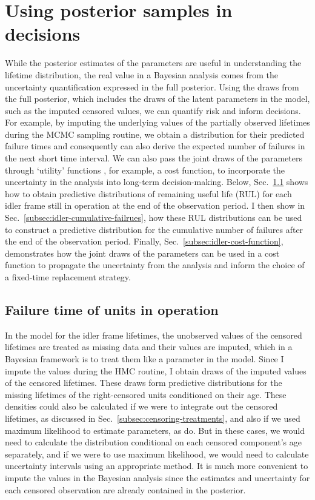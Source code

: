 \section{Using posterior samples in decisions} \label{sec:idler-frames-using-posterior}

While the posterior estimates of the parameters are useful in understanding the lifetime distribution, the real value in a Bayesian analysis comes from the uncertainty quantification expressed in the full posterior. Using the draws from the full posterior, which includes the draws of the latent parameters in the model, such as the imputed censored values, we can quantify risk and inform decisions. For example, by imputing the underlying values of the partially observed lifetimes during the MCMC sampling routine, we obtain a distribution for their predicted failure times and consequently can also derive the expected number of failures in the next short time interval. We can also pass the joint draws of the parameters through `utility' functions \citep[Chap.~9]{BDA2020}, for example, a cost function, to incorporate the uncertainty in the analysis into long-term decision-making. Below, Sec.~\ref{subsec:idler-FTs} shows how to obtain predictive distributions of remaining useful life (RUL) for each idler frame still in operation at the end of the observation period. I then show in Sec.~\ref{subsec:idler-cumulative-failrues}, how these RUL distributions can be used to construct a predictive distribution for the cumulative number of failures after the end of the observation period. Finally, Sec.~\ref{subsec:idler-cost-function}, demonstrates how the joint draws of the parameters can be used in a cost function to propagate the uncertainty from the analysis and inform the choice of a fixed-time replacement strategy.

\subsection{Failure time of units in operation} \label{subsec:idler-FTs}

In the model for the idler frame lifetimes, the unobserved values of the censored lifetimes are treated as missing data and their values are imputed, which in a Bayesian framework is to treat them like a parameter in the model. Since I impute the values during the HMC routine, I obtain draws of the imputed values of the censored lifetimes. These draws form predictive distributions for the missing lifetimes of the right-censored units conditioned on their age. These densities could also be calculated if we were to integrate out the censored lifetimes, as discussed in Sec.~\ref{subsec:censoring-treatments}, and also if we used maximum likelihood to estimate parameters, as \citet{hong2009} do. But in these cases, we would need to calculate the distribution conditional on each censored component's age separately, and if we were to use maximum likelihood, we would need to calculate uncertainty intervals using an appropriate method. It is much more convenient to impute the values in the Bayesian analysis since the estimates and uncertainty for each censored observation are already contained in the posterior.

